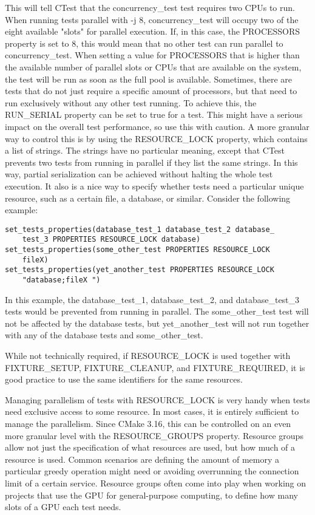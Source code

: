 This will tell CTest that the concurrency\_test test requires two CPUs to run. When running tests parallel with -j 8, concurrency\_test will occupy two of the eight available "slots" for parallel execution. If, in this case, the PROCESSORS property is set to 8, this would mean that no other test can run parallel to concurrency\_test. When setting a value for PROCESSORS that is higher than the available number of parallel slots or CPUs that are available on the system, the test will be run as soon as the full pool is available. Sometimes, there are tests that do not just require a specific amount of processors, but that need to run exclusively without any other test running. To achieve this, the RUN\_SERIAL property can be set to true for a test. This might have a serious impact on the overall test performance, so use this with caution. A more granular way to control this is by using the RESOURCE\_LOCK property, which contains a list of strings. The strings have no particular meaning, except that CTest prevents two tests from running in parallel if they list the same strings. In this way, partial serialization can be achieved without halting the whole test execution. It also is a nice way to specify whether tests need a particular unique resource, such as a certain file, a database, or similar. Consider the following example:

\begin{lstlisting}[style=styleCMake]
set_tests_properties(database_test_1 database_test_2 database_
	test_3 PROPERTIES RESOURCE_LOCK database)
set_tests_properties(some_other_test PROPERTIES RESOURCE_LOCK
	fileX)
set_tests_properties(yet_another_test PROPERTIES RESOURCE_LOCK
	"database;fileX ")
\end{lstlisting}

In this example, the database\_test\_1, database\_test\_2, and database\_test\_3 tests would be prevented from running in parallel. The some\_other\_test test will not be affected by the database tests, but yet\_another\_test will not run together with any of the database tests and some\_other\_test.

\begin{tcolorbox}[colback=blue!5!white,colframe=blue!75!black,title=Fixtures as Resources]
While not technically required, if RESOURCE\_LOCK is used together with FIXTURE\_SETUP, FIXTURE\_CLEANUP, and FIXTURE\_REQUIRED, it is good practice to use the same identifiers for the same resources.
\end{tcolorbox}

Managing parallelism of tests with RESOURCE\_LOCK is very handy when tests need exclusive access to some resource. In most cases, it is entirely sufficient to manage the parallelism. Since CMake 3.16, this can be controlled on an even more granular level with the RESOURCE\_GROUPS property. Resource groups allow not just the specification of what resources are used, but how much of a resource is used. Common scenarios are defining the amount of memory a particular greedy operation might need or avoiding overrunning the connection limit of a certain service. Resource groups often come into play when working on projects that use the GPU for general-purpose computing, to define how many slots of a GPU each test needs.

